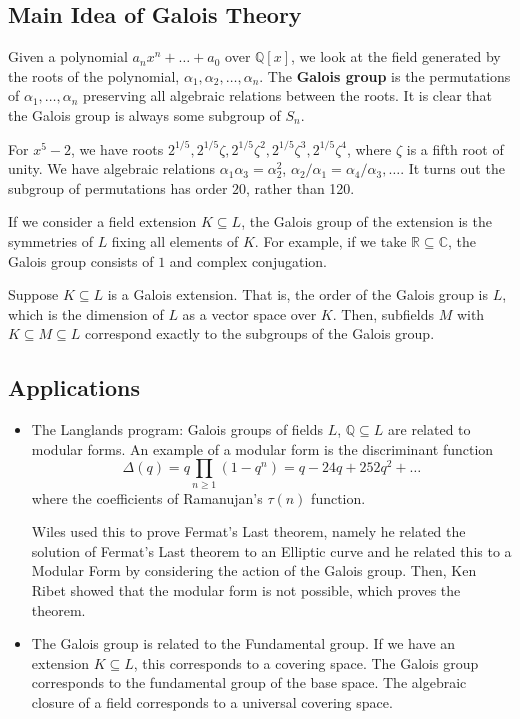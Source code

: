 \documentclass[11pt]{scrartcl}
\newcommand{\Q}{\mathbb{Q}}
\newcommand{\R}{\mathbb{R}}
\newcommand{\C}{\mathbb C}
\begin{document}
\subsection{Main Idea of Galois Theory}
Given a polynomial $a_nx^n + \dots + a_0$ over $\Q[x]$, we look at the field generated by the roots of the polynomial, $\alpha_1, \alpha_2, \dots, \alpha_n$.  The \textbf{Galois group} is the permutations of $\alpha_1, \dots, \alpha_n$ preserving all algebraic relations between the roots.  It is clear that the Galois group is always some subgroup of $S_n$.

For $x^5 - 2$, we have roots $2^{1/5}, 2^{1/5}\zeta, 2^{1/5}\zeta^2, 2^{1/5}\zeta^3, 2^{1/5}\zeta^4$, where $\zeta$ is a fifth root of unity.  We have algebraic relations $\alpha_1\alpha_3 = \alpha_2^2$, $\alpha_2/\alpha_1 = \alpha_4/\alpha_3, \dots$.  It turns out the subgroup of permutations has order $20$, rather than 120.

If we consider a field extension $K \subseteq L$, the Galois group of the extension is the symmetries of $L$ fixing all elements of $K$.  For example, if we take $\R \subseteq \C$, the Galois group consists of $1$ and complex conjugation.  

\begin{thm} Suppose $K \subseteq L$ is a Galois extension.  That is, the order of the Galois group is $L$, which is the dimension of $L$ as a vector space over $K$.  
Then, subfields $M$ with $K \subseteq M \subseteq L$ correspond exactly to the subgroups of the Galois group.
\end{thm}

\subsection{Applications}
\begin{itemize}
\item The Langlands program: Galois groups of fields $L$, $\Q \subseteq L$ are related to modular forms.  An example of a modular form is the discriminant function
$$\Delta(q) = q \prod_{n \ge 1} (1 - q^n) = q- 24q + 252q^2 + \dots$$
where the coefficients of Ramanujan's $\tau(n)$ function. 

Wiles used this to prove Fermat's Last theorem, namely he related the solution of Fermat's Last theorem to an Elliptic curve and he related this to a Modular Form by considering the action of the Galois group.  Then, Ken Ribet showed that the modular form is not possible, which proves the theorem.
\item The Galois group is related to the Fundamental group.  If we have an extension $K \subseteq L$, this corresponds to a covering space.  The Galois group corresponds to the fundamental group of the base space.  The algebraic closure of a field corresponds to a universal covering space.
\end{itemize}
\end{document}
